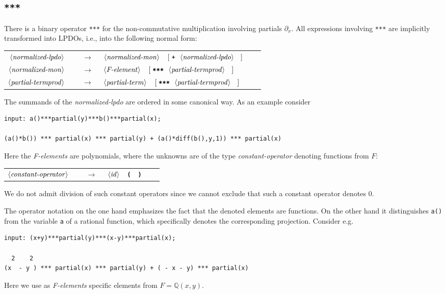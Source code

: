 \documentclass[a4paper]{article}
\newcommand{\Q}{\mathbb{Q}}
\newcommand{\txt}{\textrm}
\newenvironment{ebnf}{\begin{tabular}{rcll}}{\end{tabular}}
\newcommand{\ebnfvara}[1]{$\left\langle \text{\textit{#1}}\right\rangle$\ \ }
\newcommand{\ebnfor}{\txt{\ $|$\ \ }}
\newcommand{\ebnfterm}[1]{\txt{\textbf{\texttt{#1}}}\ \ }
\newcommand{\ebnfoption}[1]{\txt{$\left[\;\text{#1}\;\right]$}\ \ }
\newcommand{\ebnfrule}[2]{{#1}&$\ \ \rightarrow\ \ $&{#2}&\\}
\begin{document}
\subsection{\texttt{***}}
There is a binary operator \texttt{***} for the non-commutative
multiplication involving partials $\partial_x$. All expressions
involving \texttt{***} are implicitly transformed into LPDOs, i.e.,
into the following normal form:
\begin{center}
  \begin{ebnf}
    \ebnfrule{\ebnfvara{normalized-lpdo}}{\ebnfvara{normalized-mon}\ebnfoption{\ebnfterm{+}\ebnfvara{normalized-lpdo}}}
    \ebnfrule{\ebnfvara{normalized-mon}}{\ebnfvara{F-element}\ebnfoption{\ebnfterm{***}\ebnfvara{partial-termprod}}}
    \ebnfrule{\ebnfvara{partial-termprod}}{\ebnfvara{partial-term}\ebnfoption{\ebnfterm{***}\ebnfvara{partial-termprod}}}
  \end{ebnf}
\end{center}
The summands of the \textit{normalized-lpdo} are ordered in some
canonical way. As an example consider

\begin{footnotesize}
\begin{verbatim}
input: a()***partial(y)***b()***partial(x);

(a()*b()) *** partial(x) *** partial(y) + (a()*diff(b(),y,1)) *** partial(x)
\end{verbatim}
\end{footnotesize}
Here the \textit{F-elements} are polynomials, where the unknowns are
of the type \emph{constant-operator} denoting functions from $F$:

\begin{center}
  \begin{ebnf}
    \ebnfrule{\ebnfvara{constant-operator}}{\ebnfvara{id}\ebnfterm{(}\ebnfterm{)}}
  \end{ebnf}
\end{center}
We do not admit division of such constant operators since we cannot
exclude that such a constant operator denotes $0$.

The operator notation on the one hand emphasizes the fact that the
denoted elements are functions. On the other hand it distinguishes
\texttt{a()} from the variable \texttt{a} of a rational function,
which specifically denotes the corresponding projection. Consider e.g.

\begin{footnotesize}
\begin{verbatim}
input: (x+y)***partial(y)***(x-y)***partial(x);

  2    2
(x  - y ) *** partial(x) *** partial(y) + ( - x - y) *** partial(x)
\end{verbatim}
\end{footnotesize}
Here we use as \textit{F-elements} specific elements from $F=\Q(x,y)$.
\end{document}
